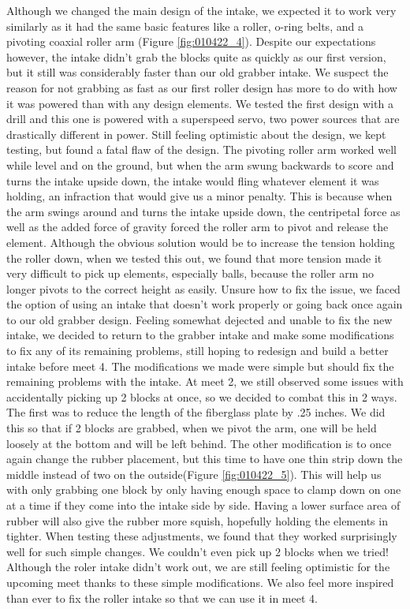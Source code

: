 Although we changed the main design of the intake, we expected it to work very similarly as it had the same basic features like a roller, o-ring belts, and a pivoting coaxial roller arm (Figure \ref{fig:010422_4}). Despite our expectations however, the intake didn’t grab the blocks quite as quickly as our first version, but it still was considerably faster than our old grabber intake. We suspect the reason for not grabbing as fast as our first roller design has more to do with how it was powered than with any design elements. We tested the first design with a drill and this one is powered with a superspeed servo, two power sources that are drastically different in power. Still feeling optimistic about the design, we kept testing, but found a fatal flaw of the design. The pivoting roller arm worked well while level and on the ground, but when the arm swung backwards to score and turns the intake upside down, the intake would fling whatever element it was holding, an infraction that would give us a minor penalty. This is because when the arm swings around and turns the intake upside down, the centripetal force as well as the added force of gravity forced the roller arm to pivot and release the element. Although the obvious solution would be to increase the tension holding the roller down, when we tested this out, we found that more tension made it very difficult to pick up elements, especially balls, because the roller arm no longer pivots to the correct height as easily. Unsure how to fix the issue, we faced the option of using an intake that doesn’t work properly or going back once again to our old grabber design. Feeling somewhat dejected and unable to fix the new intake, we decided to return to the grabber intake and make some modifications to fix any of its remaining problems, still hoping to redesign and build a better intake before meet 4.
The modifications we made were simple but should fix the remaining problems with the intake. At meet 2, we still observed some issues with accidentally picking up 2 blocks at once, so we decided to combat this in 2 ways. The first was to reduce the length of the fiberglass plate by .25 inches. We did this so that if 2 blocks are grabbed, when we pivot the arm, one will be held loosely at the bottom and will be left behind. The other modification is to once again change the rubber placement, but this time to have one thin strip down the middle instead of two on the outside(Figure \ref{fig:010422_5}). This will help us with only grabbing one block by only having enough space to clamp down on one at a time if they come into the intake side by side. Having a lower surface area of rubber will also give the rubber more squish, hopefully holding the elements in tighter. When testing these adjustments, we found that they worked surprisingly well for such simple changes. We couldn’t even pick up 2 blocks when we tried! Although the roler intake didn't work out, we are still feeling optimistic for the upcoming meet thanks to these simple modifications. We also feel more inspired than ever to fix the roller intake so that we can use it in meet 4.

